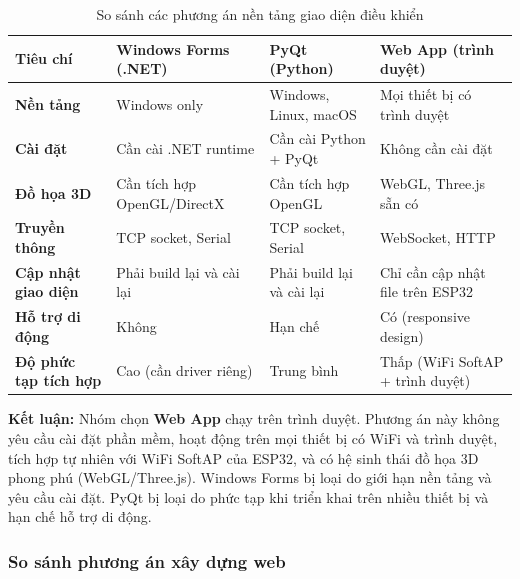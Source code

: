             \begin{table}[H]
            \centering
            \caption{So sánh các phương án nền tảng giao diện điều khiển}
            \label{tab:gui_options}
            \begin{tabular}{|>{\centering\arraybackslash}m{2.8cm}|>{\centering\arraybackslash}m{3.5cm}|>{\centering\arraybackslash}m{3.5cm}|>{\centering\arraybackslash}m{3.5cm}|}
            \hline
            \textbf{Tiêu chí} & \textbf{Windows Forms (.NET)} & \textbf{PyQt (Python)} & \textbf{Web App (trình duyệt)} \\
            \hline
            \textbf{Nền tảng} & Windows only & Windows, Linux, macOS & Mọi thiết bị có trình duyệt \\
            \hline
            \textbf{Cài đặt} & Cần cài .NET runtime & Cần cài Python + PyQt & Không cần cài đặt \\
            \hline
            \textbf{Đồ họa 3D} & Cần tích hợp OpenGL/DirectX & Cần tích hợp OpenGL & WebGL, Three.js sẵn có \\
            \hline
            \textbf{Truyền thông} & TCP socket, Serial & TCP socket, Serial & WebSocket, HTTP \\
            \hline
            \textbf{Cập nhật giao diện} & Phải build lại và cài lại & Phải build lại và cài lại & Chỉ cần cập nhật file trên ESP32 \\
            \hline
            \textbf{Hỗ trợ di động} & Không & Hạn chế & Có (responsive design) \\
            \hline
            \textbf{Độ phức tạp tích hợp} & Cao (cần driver riêng) & Trung bình & Thấp (WiFi SoftAP + trình duyệt) \\
            \hline
            \end{tabular}
            \end{table}

            \textbf{Kết luận:} Nhóm chọn \textbf{Web App} chạy trên trình duyệt. Phương án này không yêu cầu cài đặt phần mềm, hoạt động trên mọi thiết bị có WiFi và trình duyệt, tích hợp tự nhiên với WiFi SoftAP của ESP32, và có hệ sinh thái đồ họa 3D phong phú (WebGL/Three.js). Windows Forms bị loại do giới hạn nền tảng và yêu cầu cài đặt. PyQt bị loại do phức tạp khi triển khai trên nhiều thiết bị và hạn chế hỗ trợ di động.

            \subsubsection{So sánh phương án xây dựng web}

